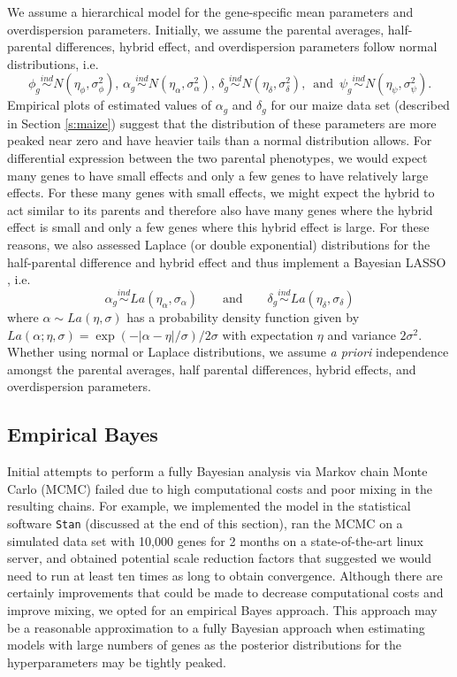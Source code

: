 \documentclass[useAMS,usenatbib,referee]{biom}
\newcommand{\Stan}{{\tt Stan}}
\begin{document}
We assume a hierarchical model for the gene-specific mean parameters and overdispersion parameters. Initially, we assume the parental averages, half-parental differences, hybrid effect, and overdispersion parameters follow normal distributions, i.e.
\[ 
\phi_g \stackrel{ind}{\sim} N(\eta_\phi, \sigma_\phi^2), \,
\alpha_g \stackrel{ind}{\sim} N(\eta_\alpha, \sigma_\alpha^2), \,
\delta_g \stackrel{ind}{\sim} N(\eta_\delta, \sigma_\delta^2), \, \mbox{ and } \,
\psi_g \stackrel{ind}{\sim} N(\eta_\psi,\sigma_\psi^2). 
\]
Empirical plots of estimated values of $\alpha_g$ and $\delta_g$ for our maize data set (described in Section \ref{s:maize}) suggest that the distribution of these parameters are more peaked near zero and have heavier tails than a normal distribution allows. For differential expression between the two parental phenotypes, we would expect many genes to have small effects and only a few genes to have relatively large effects. For these many genes with small effects, we might expect the hybrid to act similar to its parents and therefore also have many genes where the hybrid effect is small and only a few genes where this hybrid effect is large. For these reasons, we also assessed Laplace (or double exponential) distributions for the half-parental difference and hybrid effect and thus implement a Bayesian LASSO \citep{park2008bayesian,hans2009bayesian}, i.e. 
\[ 
\alpha_g \stackrel{ind}{\sim} La(\eta_\alpha, \sigma_\alpha) \qquad \mbox{and} \qquad
\delta_g \stackrel{ind}{\sim} La(\eta_\delta, \sigma_\delta) 
\]
where $\alpha\sim La(\eta,\sigma)$ has a probability density function given by $La(\alpha;\eta,\sigma) = \exp(-|\alpha-\eta|/\sigma)/2\sigma$ with expectation $\eta$ and variance $2\sigma^2$. Whether using normal or Laplace distributions, we assume \emph{a priori} independence amongst the parental averages, half parental differences, hybrid effects, and overdispersion parameters. 

\subsection{Empirical Bayes}
\label{s:ebayes}

Initial attempts to perform a fully Bayesian analysis via Markov chain Monte Carlo (MCMC) failed due to high computational costs and poor mixing in the resulting chains. For example, we implemented the model in the statistical software \Stan{} (discussed at the end of this section), ran the MCMC on a simulated data set with 10,000 genes for 2 months on a state-of-the-art linux server, and obtained potential scale reduction factors \citep{Gelm:Rubi:infe:1992} that suggested we would need to run at least ten times as long to obtain convergence. Although there are certainly improvements that could be made to decrease computational costs and improve mixing, we opted for an empirical Bayes approach. This approach may be a reasonable approximation to a fully Bayesian approach when estimating models with large numbers of genes as the posterior distributions for the hyperparameters may be tightly peaked. 
\end{document}

